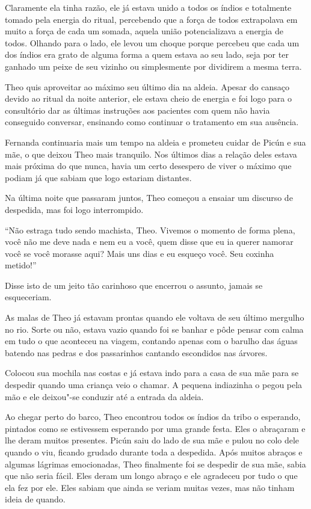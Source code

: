 Claramente ela tinha razão, ele já estava unido a todos os índios e
totalmente tomado pela energia do ritual, percebendo que a força de
todos extrapolava em muito a força de cada um somada, aquela união
potencializava a energia de todos. Olhando para o lado, ele levou um
choque porque percebeu que cada um dos índios era grato de alguma forma
a quem estava ao seu lado, seja por ter ganhado um peixe de seu vizinho
ou simplesmente por dividirem a mesma terra.

\asterisc


Theo quis aproveitar ao máximo seu último dia na aldeia. Apesar do
cansaço devido ao ritual da noite anterior, ele estava cheio de energia
e foi logo para o consultório dar as últimas instruções aos pacientes
com quem não havia conseguido conversar, ensinando como continuar o
tratamento em sua ausência.

Fernanda continuaria mais um tempo na aldeia e prometeu cuidar de Picún
e sua mãe, o que deixou Theo mais tranquilo. Nos últimos dias a relação
deles estava mais próxima do que nunca, havia um certo desespero de
viver o máximo que podiam já que sabiam que logo estariam distantes.

Na última noite que passaram juntos, Theo começou a ensaiar um discurso
de despedida, mas foi logo interrompido.

``Não estraga tudo sendo machista, Theo. Vivemos o momento de forma
plena, você não me deve nada e nem eu a você, quem disse que eu ia
querer namorar você se você morasse aqui? Mais uns dias e eu esqueço
você. Seu coxinha metido!''

Disse isto de um jeito tão carinhoso que encerrou o assunto, jamais se
esqueceriam.

As malas de Theo já estavam prontas quando ele voltava de seu último
mergulho no rio. Sorte ou não, estava vazio quando foi se banhar e pôde
pensar com calma em tudo o que aconteceu na viagem, contando apenas com
o barulho das águas batendo nas pedras e dos passarinhos cantando
escondidos nas árvores.

Colocou sua mochila nas costas e já estava indo para a casa de sua mãe
para se despedir quando uma criança veio o chamar. A pequena indiazinha
o pegou pela mão e ele deixou"-se conduzir até a entrada da aldeia.

Ao chegar perto do barco, Theo encontrou todos os índios da tribo o
esperando, pintados como se estivessem esperando por uma grande festa.
Eles o abraçaram e lhe deram muitos presentes. Picún saiu do lado de sua
mãe e pulou no colo dele quando o viu, ficando grudado durante toda a
despedida. Após muitos abraços e algumas lágrimas emocionadas, Theo
finalmente foi se despedir de sua mãe, sabia que não seria fácil. Eles
deram um longo abraço e ele agradeceu por tudo o que ela fez por ele.
Eles sabiam que ainda se veriam muitas vezes, mas não tinham ideia de
quando.

